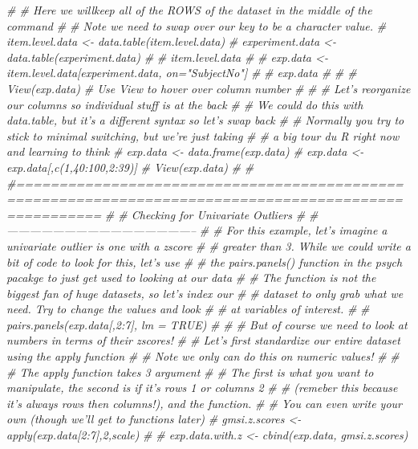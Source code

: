 \documentclass[]{book}
\newenvironment{Shaded}{\begin{snugshade}}{\end{snugshade}}
\newcommand{\CommentTok}[1]{\textcolor[rgb]{0.56,0.35,0.01}{\textit{#1}}}
\theoremstyle{definition}
\theoremstyle{definition}
\theoremstyle{definition}
\theoremstyle{remark}
\begin{document}
\begin{Shaded}
\begin{Highlighting}[]
\CommentTok{# # Here we willkeep all of the ROWS of the dataset in the middle of the command }
\CommentTok{# # Note we need to swap over our key to be a character value.}
\CommentTok{# item.level.data <- data.table(item.level.data)}
\CommentTok{# experiment.data <- data.table(experiment.data)}
\CommentTok{# }
\CommentTok{# item.level.data}
\CommentTok{# }
\CommentTok{# exp.data <- item.level.data[experiment.data, on="SubjectNo"]}
\CommentTok{# }
\CommentTok{# exp.data}
\CommentTok{# }
\CommentTok{# # View(exp.data) # Use View to hover over column number}
\CommentTok{# }
\CommentTok{# # Let's reorganize our columns so individual stuff is at the back}
\CommentTok{# # We could do this with data.table, but it's a different syntax so let's swap back}
\CommentTok{# # Normally you try to stick to minimal switching, but we're just taking }
\CommentTok{# # a big tour du R right now and learning to think }
\CommentTok{# exp.data <- data.frame(exp.data)}
\CommentTok{# exp.data <- exp.data[,c(1,40:100,2:39)]}
\CommentTok{# View(exp.data)}
\CommentTok{# }
\CommentTok{# #======================================================================================================}
\CommentTok{# # Checking for Univariate Outliers}
\CommentTok{# #--------------------------------------------------}
\CommentTok{# # For this example, let's imagine a univariate outlier is one with a zscore}
\CommentTok{# # greater than 3. While we could write a bit of code to look for this, let's use }
\CommentTok{# # the pairs.panels() function in the psych pacakge to just get used to looking at our data}
\CommentTok{# # The function is not the biggest fan of huge datasets, so let's index our }
\CommentTok{# # dataset to only grab what we need. Try to change the values and look }
\CommentTok{# # at variables of interest. }
\CommentTok{# }
\CommentTok{# pairs.panels(exp.data[,2:7], lm = TRUE)}
\CommentTok{# }
\CommentTok{# # But of course we need to look at numbers in terms of their zscores!}
\CommentTok{# # Let's first standardize our entire dataset using the apply function}
\CommentTok{# # Note we only can do this on numeric values! }
\CommentTok{# }
\CommentTok{# # The apply function takes 3 argument}
\CommentTok{# # The first is what you want to manipulate, the second is if it's rows 1 or columns 2}
\CommentTok{# # (remeber this because it's always rows then columns!), and the function.}
\CommentTok{# # You can even write your own (though we'll get to functions later)}
\CommentTok{# gmsi.z.scores <- apply(exp.data[2:7],2,scale)}
\CommentTok{# }
\CommentTok{# exp.data.with.z <- cbind(exp.data, gmsi.z.scores)}

\end{Highlighting}
\end{Shaded}
\end{document}
